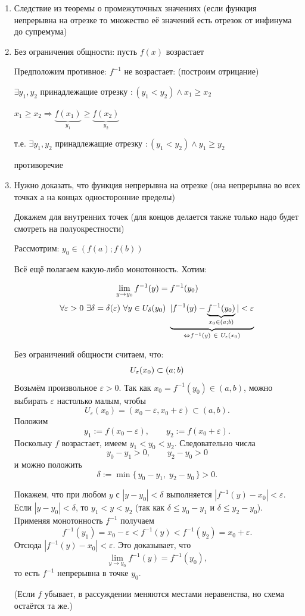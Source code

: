 \begin{Proof}
	\begin{enumerate}
		\item[\bf 1)] Следствие из теоремы о промежуточных значениях
		(если функция непрерывна на отрезке то множество её значений есть отрезок от инфинума до супремума)
		\item[\bf3)] Без ограничения общности: пусть $f(x)$ возрастает

		Предположим противное: $f^{-1}$ не возрастает: (построим отрицание)

		$\exists y_1, y_2$ принадлежащие отрезку $: (y_1 < y_2) \land x_1 \geq x_2$

		$x_1 \geq x_2 \Rightarrow \underbrace{f(x_1)}_{y_1} \geq \underbrace{f(x_2)}_{y_2}$


		т.е. $\exists y_1, y_2$ принадлежащие отрезку $: (y_1 < y_2) \land y_1 \geq y_2$

		противоречие

		\item[\bf 2)] Нужно доказать, что функция непрерывна на отрезке (она непрерывна во всех точках а на концах односторонние пределы)

		Докажем для внутренних точек (для концов делается также только надо будет смотреть на полуокрестности)

		Рассмотрим: $y_0 \in (f(a); f(b))$

		Всё ещё полагаем какую-либо монотонность. Хотим:

		\[
			\lim\limits_{y \to y_0} f^{-1}(y) = f^{-1}(y_0)  
		\]
		\[
			\forall \eps > 0\ \exists \delta = \delta (\eps )\ \forall y \in U_{\delta }(y_0)\ \underbrace{|f^{-1}(y) - \underbrace{f^{-1}(y_0)}_{x_0 \in (a;b)}| < \eps }_{\Leftrightarrow f^{-1}(y)~\in~U_{\epsilon}(x_0)}
		\]

		Без ограничений общности считаем, что:
		\[
			U_{\varepsilon }(x_0) \subset (a;b) 
		\]
Возьмём произвольное $\varepsilon>0$. Так как $x_0=f^{-1}(y_0)\in(a,b)$, можно выбирать $\varepsilon$ настолько малым, чтобы
\[
U_{\varepsilon}(x_0)=(x_0-\varepsilon,x_0+\varepsilon)\subset (a,b).
\]
Положим
\[
y_1:=f(x_0-\varepsilon),\qquad y_2:=f(x_0+\varepsilon).
\]
Поскольку $f$ возрастает, имеем $y_1<y_0<y_2$. Следовательно числа
\[
y_0-y_1>0,\qquad y_2-y_0>0
\]
и можно положить
\[
\delta:=\min\{\,y_0-y_1,\;y_2-y_0\,\}>0.
\]

Покажем, что при любом $y$ с $|y-y_0|<\delta$ выполняется $|f^{-1}(y)-x_0|<\varepsilon$.
Если $|y-y_0|<\delta$, то $y_1<y<y_2$ (так как $\delta\le y_0-y_1$ и $\delta\le y_2-y_0$). Применяя монотонность $f^{-1}$ получаем
\[
f^{-1}(y_1)=x_0-\varepsilon < f^{-1}(y) < f^{-1}(y_2)=x_0+\varepsilon.
\]
Отсюда $|f^{-1}(y)-x_0|<\varepsilon$. Это доказывает, что
\[
\lim_{y\to y_0} f^{-1}(y)=f^{-1}(y_0),
\]
то есть $f^{-1}$ непрерывна в точке $y_0$.

(Если $f$ убывает, в рассуждении меняются местами неравенства, но схема остаётся та же.) 

	\end{enumerate}

\end{Proof}

